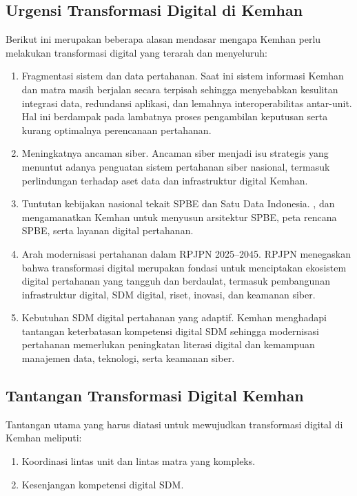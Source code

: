 \subsection{Urgensi Transformasi Digital di Kemhan}
Berikut ini merupakan beberapa alasan mendasar mengapa Kemhan perlu melakukan transformasi digital yang terarah dan menyeluruh:
\begin{enumerate}
  \item Fragmentasi sistem dan data pertahanan.
  Saat ini sistem informasi Kemhan dan matra masih berjalan secara terpisah sehingga menyebabkan kesulitan integrasi data, redundansi aplikasi, dan lemahnya interoperabilitas antar-unit.
  Hal ini berdampak pada lambatnya proses pengambilan keputusan serta kurang optimalnya perencanaan pertahanan.
  \item Meningkatnya ancaman siber.
  Ancaman siber menjadi isu strategis yang menuntut adanya penguatan sistem pertahanan siber nasional,
  termasuk perlindungan terhadap aset data dan infrastruktur digital Kemhan.
  \item Tuntutan kebijakan nasional tekait SPBE dan Satu Data Indonesia.
  \autocite{KementerianKomunikasidanInformatika2018}, dan \autocite{RepublikIndonesia2023} mengamanatkan Kemhan untuk menyusun arsitektur SPBE, peta rencana SPBE, serta layanan digital pertahanan.
  \item Arah modernisasi pertahanan dalam RPJPN 2025–2045.
  RPJPN menegaskan bahwa transformasi digital merupakan fondasi untuk menciptakan ekosistem digital pertahanan yang tangguh dan berdaulat, termasuk pembangunan infrastruktur digital, SDM digital, riset, inovasi, dan keamanan siber.
  \item Kebutuhan SDM digital pertahanan yang adaptif.
  Kemhan menghadapi tantangan keterbatasan kompetensi digital SDM sehingga modernisasi pertahanan memerlukan peningkatan literasi digital dan kemampuan manajemen data, teknologi, serta keamanan siber.
\end{enumerate}

\subsection{Tantangan Transformasi Digital Kemhan}
Tantangan utama yang harus diatasi untuk mewujudkan transformasi digital di Kemhan meliputi:
\begin{enumerate}
  \item Koordinasi lintas unit dan lintas matra yang kompleks.
  \item Kesenjangan kompetensi digital SDM.
\end{enumerate}

